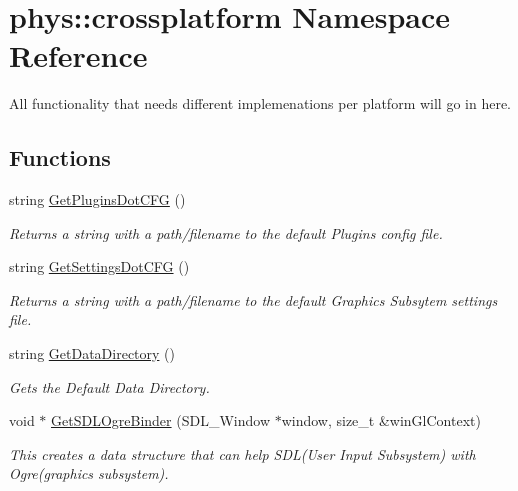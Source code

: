 \hypertarget{namespacephys_1_1crossplatform}{
\section{phys::crossplatform Namespace Reference}
\label{d4/d59/namespacephys_1_1crossplatform}
}


All functionality that needs different implemenations per platform will go in here.  


\subsection*{Functions}
\begin{DoxyCompactItemize}
\item 
string \hyperlink{namespacephys_1_1crossplatform_a8f7321f409f1f2a5fa07881ae22fcc2d}{GetPluginsDotCFG} ()
\begin{DoxyCompactList}\small\item\em Returns a string with a path/filename to the default Plugins config file. \item\end{DoxyCompactList}\item 
string \hyperlink{namespacephys_1_1crossplatform_a2d43f3aa5a485564c3f375b36a08152f}{GetSettingsDotCFG} ()
\begin{DoxyCompactList}\small\item\em Returns a string with a path/filename to the default Graphics Subsytem settings file. \item\end{DoxyCompactList}\item 
string \hyperlink{namespacephys_1_1crossplatform_ae7b1d4b6dac634392c6224f26ab85001}{GetDataDirectory} ()
\begin{DoxyCompactList}\small\item\em Gets the Default Data Directory. \item\end{DoxyCompactList}\item 
void $\ast$ \hyperlink{namespacephys_1_1crossplatform_ae7aee515262e81cb9c1cfad652c86044}{GetSDLOgreBinder} (SDL\_\-Window $\ast$window, size\_\-t \&winGlContext)
\begin{DoxyCompactList}\small\item\em This creates a data structure that can help SDL(User Input Subsystem) with Ogre(graphics subsystem). \item\end{DoxyCompactList}\item 

\end{DoxyCompactItemize}
